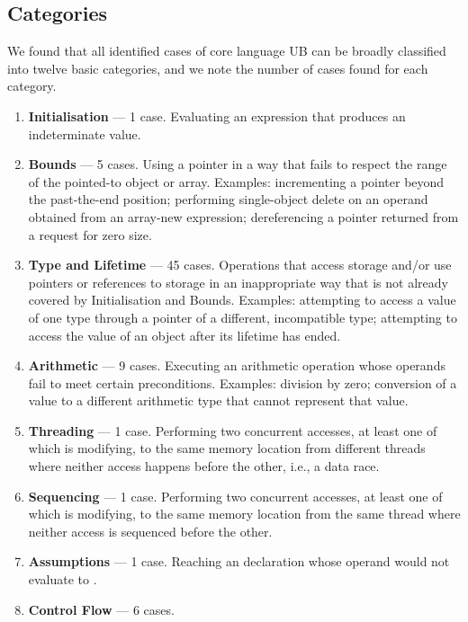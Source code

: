 \subsection{Categories}
\label{categories}

We found that all identified cases of core language UB can be broadly classified into twelve basic categories, and we note the number of cases found for each category.
 \renewcommand{\labelenumi}{\Roman{enumi}.}
\begin{enumerate}
\item \textbf{Initialisation} --- 1 case. Evaluating an expression that produces an indeterminate value. %
\item \textbf{Bounds} --- 5 cases. Using a pointer in a way that fails to respect the range of the pointed-to object or array. Examples: incrementing a pointer beyond the past-the-end position; performing single-object delete on an operand obtained from an array-new expression;  dereferencing a pointer returned from a request for zero size.
\item \textbf{Type and Lifetime} --- 45 cases. Operations that access storage and/or use pointers or references to storage in an inappropriate way that is not already covered by Initialisation and Bounds. Examples: attempting to access a value of one type through  a pointer of a different, incompatible type; attempting to access the value of an object after its lifetime has ended. 
\item \textbf{Arithmetic} --- 9 cases. Executing an arithmetic operation whose operands fail to meet certain preconditions. Examples: division by zero; conversion of a value to a different arithmetic type that cannot represent that value. 
\item \textbf{Threading} --- 1 case. Performing two concurrent accesses, at least one of which is modifying, to the same memory location from different threads where neither access happens before the other, i.e., a data race. %
\item \textbf{Sequencing} --- 1 case. Performing two concurrent accesses, at least one of which is modifying, to the same memory location from the same thread where neither access is sequenced before the other. %
\item \textbf{Assumptions} --- 1 case. Reaching an \tcode{[[assume]]} declaration whose operand would not evaluate to .
\item \textbf{Control Flow} --- 6 cases. %

\end{enumerate}
